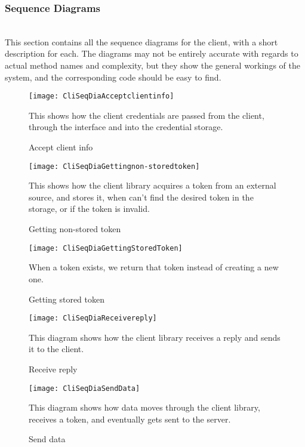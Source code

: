 	\subsubsection{Sequence Diagrams}\label{client sequence diagrams}\\
This section contains all the sequence diagrams for the client, with a short description for each. The diagrams may not be entirely accurate with regards to actual method names and complexity, but they show the general workings of the system, and the corresponding code should be easy to find.
		\begin{figure}[H]
			\centering	
			\texttt{[image: CliSeqDiaAcceptclientinfo]}
			\caption{Accept client info}
			This shows how the client credentials are passed from the client, through the interface and into the credential storage.
			\label{fig:CliSeqDiaAcceptclientinfo}
		\end{figure}
		\begin{figure}[H]
			\centering	
			\texttt{[image: CliSeqDiaGettingnon-storedtoken]}
			\caption{Getting non-stored token}
			This shows how the client library acquires a token from an external source, and stores it, when can't find the desired token in the storage, or if the token is invalid.
			\label{fig:CliSeqDiaGettingnon-storedtoken}
		\end{figure}
		\begin{figure}[H]
			\centering	
			\texttt{[image: CliSeqDiaGettingStoredToken]}
			\caption{Getting stored token}
			When a token exists, we return that token instead of creating a new one. 
			\label{fig:CliSeqDiaGettingStoredToken}
		\end{figure}
		\begin{figure}[H]
			\centering	
			\texttt{[image: CliSeqDiaReceivereply]}
			\caption{Receive reply}
			This diagram shows how the client library receives a reply and sends it to the client. 
			\label{fig:CliSeqDiaReceivereply}
		\end{figure}
		\begin{figure}[H]
			\centering	
			\texttt{[image: CliSeqDiaSendData]}
			\caption{Send data}
			This diagram shows how data moves through the client library, receives a token, and eventually gets sent to the server. 
			\label{fig:CliSeqDiaSendData}
		\end{figure}

		

